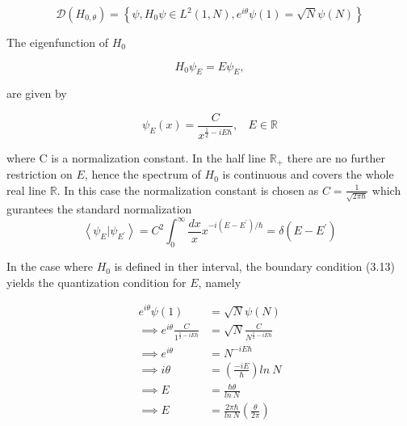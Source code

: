 \documentclass[12pt]{report}
\newcommand*{\1}{\hspace{1pt}}
\begin{document}
        \begin{equation}
             \mathcal{D}(H_{0,\theta}) = \left\{\psi, H_{0}\psi \in  L^{2} (1, N), e^{i\theta}\psi(1) = \sqrt{N}\psi(N)\right\}
        \end{equation}

        The eigenfunction of $H_{0}$ 

        \begin{equation}
            H_{0}\psi_{E} = E \psi_{E},
        \end{equation}

        are given by \cite{s1}

        \begin{equation}
            \psi _{E} (x) = \frac{C}{x^{\frac{1}{2}-iE\hbar}} , \ \ \ \ E \in \mathbb{R} 
        \end{equation}

        where C is a normalization constant. In the half line $\mathbb{R}_{+}$ there are no further restriction on $E$, hence the spectrum of $H_{0}$ is continuous 
        and covers the whole real line $\mathbb{R}$. In this case the normalization constant is chosen as $C = \frac{1}{\sqrt{2\pi\hbar}}$ which gurantees the standard 
        normalization
        \begin{equation}
            \left\langle\psi_{E}|\psi_{E^{'}}\right\rangle = C^{2} \int_{0}^{\infty} \frac{dx}{x} x^{-i(E-E^{'})/\hbar} = \delta (E-E^{'}) 
        \end{equation}

        In the case where $H_{0}$ is defined in ther interval, the boundary condition (3.13) yields the quantization condition for $E$, namely

        \begin{equation*}
            \begin{split}
                e^{i\theta} \psi(1) & = \sqrt{N}\psi(N) \\ 
                \implies e^{i\theta} \frac{C}{1^{\frac{1}{2}-iE\hbar}}&= \sqrt{N}\frac{C}{N^{\frac{1}{2}-iE\hbar}} \\ 
                \implies e^{i\theta} & = N^{-iE\hbar} \\ 
                \implies i\theta & = (\frac{-iE}{\hbar})ln \ N \\
                \implies E & = \frac{\hbar\theta}{ln \ N} \\
                \implies E & = \frac{2\pi\hbar}{ln \ N}( \frac{\theta}{2\pi}) \\
            \end{split}
        \end{equation*}
\end{document}
